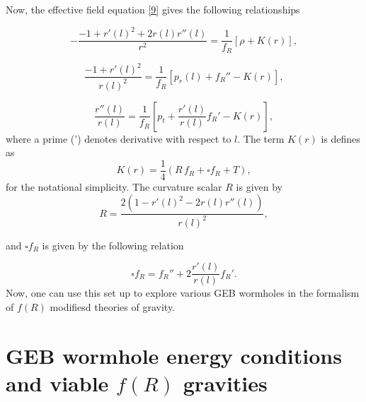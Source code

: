 Now, the effective field equation \eqref{9} gives the following relationships

\begin{equation}
\label{12}
-\frac{-1+r'(l)^2+2r(l)r''(l)}{r^2}=\frac{1}{f_R}\left[\rho+K(r)\right],
\end{equation}

\begin{equation}
\label{13}
\frac{-1+r'(l)^2}{r(l)^2}=\frac{1}{f_R}\left[p_r(l)+f_R''-K(r)\right],
\end{equation}

\begin{equation}
\label{14}
\frac{r''(l)}{r(l)}=\frac{1}{f_R}\left[p_t+\frac{r'(l)}{r(l)}f_R'-K(r)\right],
\end{equation}
where a prime (') denotes derivative with respect to $l$. The term $K(r)$ is defines as
\begin{equation}
\label{15}
K(r)=\frac{1}{4}(R\,f_R+\square f_R+T),
\end{equation}
for the notational simplicity. The curvature scalar $R$ is given by
\begin{equation}
\label{16}
R=\frac{2(1-r'(l)^2-2r(l)r''(l))}{r(l)^2},
\end{equation}

and $\square f_R$ is given by the following relation

\begin{equation}
\label{17}
\square f_R=f_R''+2\frac{r'(l)}{r(l)}f_R'.
\end{equation} 
Now, one can use this set up to explore various GEB wormholes in the formalism of $f(R)$ modifiesd theories of gravity.

\section{GEB wormhole energy conditions and viable $f(R)$ gravities}\label{sec3}

